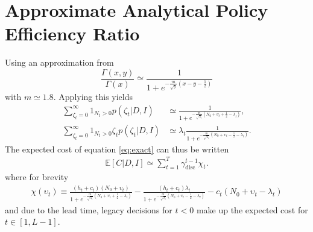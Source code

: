 \section{Approximate Analytical Policy Efficiency Ratio}
\label{app:cer}
Using an approximation from \cite{bartmann1992inventory}
\begin{equation}
	\frac{\Gamma(x,y)}{\Gamma(x)}\simeq \frac{1}{1+e^{-\frac{m}{\sqrt{y}}(x-y-\frac{1}{2})}}
\end{equation}
with $m\simeq 1.8$. Applying this yields
\begin{equation}
	\begin{split}
		\sum_{\zeta_t=0}^\infty1_{N_t> 0}p(\zeta_t| D, I) & \simeq \frac{1}{1+e^{-\frac{m}{\sqrt{\lambda_t}}(N_0+\upsilon_t+\frac{1}{2}-\lambda_t)}},\\
		\sum_{\zeta_t=0}^\infty1_{N_t> 0}\zeta_tp(\zeta_t| D, I) & \simeq \lambda_t\frac{1}{1+e^{-\frac{m}{\sqrt{\lambda_t}}(N_0+\upsilon_t-\frac{1}{2}-\lambda_t)}}.
	\end{split}
	\label{eq:hest}
\end{equation}
The expected cost of equation \eqref{eq:exact} can thus be written
\begin{equation}
	\begin{split}
		\mathbb{E}[C|D,I] \simeq \sum_{t=1}^{T} \gamma_{\text{disc}}^{t-1} \chi_t.
	\end{split}
\end{equation}
where for brevity
\begin{equation}
	\begin{split}
		\chi (\upsilon_t)\equiv 
		\frac{(h_t+c_t)(N_0 + \upsilon_t)}{1+e^{-\frac{m}{\sqrt{\lambda_t}}(N_0+\upsilon_t+\frac{1}{2}-\lambda_t)}}- \frac{(h_t+c_t)\lambda_t}{1+e^{-\frac{m}{\sqrt{\lambda_t}}(N_0+\upsilon_t-\frac{1}{2}-\lambda_t)}} - c_t(N_0 + \upsilon_t-\lambda_t)
	\end{split}
\end{equation}
and due to the lead time, legacy decisions for $t<0$ make up the expected cost for $t\in [1,L-1]$. 

